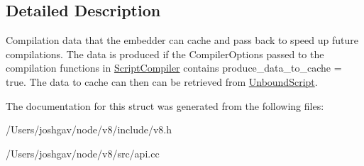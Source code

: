 \subsection{Detailed Description}
Compilation data that the embedder can cache and pass back to speed up future compilations. The data is produced if the Compiler\+Options passed to the compilation functions in \hyperlink{classv8_1_1_script_compiler}{Script\+Compiler} contains produce\+\_\+data\+\_\+to\+\_\+cache = true. The data to cache can then can be retrieved from \hyperlink{classv8_1_1_unbound_script}{Unbound\+Script}. 

The documentation for this struct was generated from the following files\+:\begin{DoxyCompactItemize}
\item 
/\+Users/joshgav/node/v8/include/v8.\+h\item 
/\+Users/joshgav/node/v8/src/api.\+cc\end{DoxyCompactItemize}
